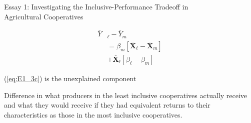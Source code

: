 \documentclass[aspectratio=169]{beamer}
\newenvironment{wideitemize}{\itemize\addtolength{\itemsep}{10pt}}{\enditemize}
\begin{document}
\begin{frame}{Essay 1: Investigating the Inclusive-Performance Tradeoff in \\ \hspace{1.7cm} Agricultural Cooperatives}
        \addtocounter{equation}{-1}
        \begin{subequations}
            \begin{align}
                \overline{Y}&_{\ell} - \overline{Y}_{m} \label{eq:E1_3a} \\
                &= \beta_{m}[\overline{\mathbf{X}}_{\ell} - \overline{\mathbf{X}}_{m}] \label{eq:E1_3b} \\
                &+ \overline{\mathbf{X}}_{\ell}[\beta_{\ell} - \beta_{m}] \label{eq:E1_3c}
            \end{align}
        \end{subequations}  
    \begin{wideitemize}
        \item (\ref{eq:E1_3c}) is the unexplained component \vspace{.25cm}
             \begin{wideitemize}
                \item Difference in what producers in the least inclusive cooperatives actually receive and what they would receive if they had equivalent returns to their characteristics as those in the most inclusive cooperatives.
            \end{wideitemize}
    \end{wideitemize}    
\end{frame}
\end{document}
